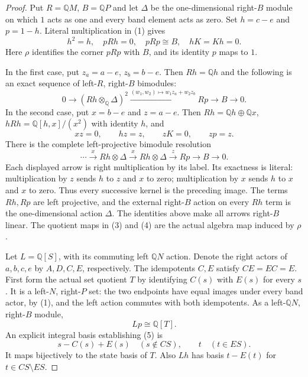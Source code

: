 \begin{proof}
Put $R=\mathbb QM$, $B=\mathbb QP$ and let
$\Delta$ be the one-dimensional right-$B$ module on
which $1$ acts as one and every band element acts as zero.
Set $h=c-e$ and $p=1-h$.
Literal multiplication in (1) gives
\[
 h^2=h,\quad pRh=0,\quad pRp\cong B,
 \quad hK=Kh=0.
                                                               \tag{2}
\]
Here $\rho$ identifies the corner $pRp$ with $B$,
and its identity $p$ maps to $1$.

In the first case, put $z_a=a-e$, $z_b=b-e$.
Then $Rh=\mathbb Qh$ and the following is an exact
sequence of left-$R$, right-$B$ bimodules:
\[
 0\longrightarrow(Rh\otimes_{\mathbb Q}\Delta)^2
   \xrightarrow{(w_1,w_2)\mapsto w_1z_a+w_2z_b}
 Rp\longrightarrow B\longrightarrow0.                         \tag{3}
\]
In the second case, put $x=b-e$ and $z=a-e$.
Then $Rh=\mathbb Qh\oplus\mathbb Qx$,
$hRh=\mathbb Q[h,x]/(x^2)$ with identity $h$, and
\[
 xz=0,\qquad hz=z,\qquad zK=0,\qquad zp=z.
\]
There is the complete left-projective bimodule resolution
\[
 \cdots\xrightarrow{\,x\,}Rh\otimes\Delta
 \xrightarrow{\,x\,}Rh\otimes\Delta
 \xrightarrow{\,z\,}Rp\longrightarrow B\longrightarrow0.
                                                               \tag{4}
\]
Each displayed arrow is right multiplication by its
label.  Its exactness is literal: multiplication by
$z$ sends $h$ to $z$ and $x$ to zero; multiplication
by $x$ sends $h$ to $x$ and $x$ to zero.
Thus every successive kernel is the preceding image.
The terms $Rh,Rp$ are left projective, and the
external right-$B$ action on every $Rh$ term is
the one-dimensional action $\Delta$.
The identities above make all arrows right-$B$ linear.
The quotient maps in (3) and (4) are the actual
algebra map induced by $\rho$.

Let $L=\mathbb Q[S]$, with its commuting left
$\mathbb QN$ action.  Denote the right actors of
$a,b,c,e$ by $A,D,C,E$, respectively.
The idempotents $C,E$ satisfy $CE=EC=E$.
First form the actual set quotient $T$ by identifying
$C(s)$ with $E(s)$ for every $s$.
It is a left-$N$, right-$P$ set: the two endpoints
have equal images under every band actor, by (1),
and the left action commutes with both idempotents.
As a left-$\mathbb QN$, right-$B$ module,
\[
 Lp\cong\mathbb Q[T].                                          \tag{5}
\]
An explicit integral basis establishing (5) is
\[
 s-C(s)+E(s)\quad(s\notin CS),\qquad t\quad(t\in ES).
\]
It maps bijectively to the state basis of $T$.
Also $Lh$ has basis $t-E(t)$ for $t\in CS\setminus ES$.


\end{proof}

